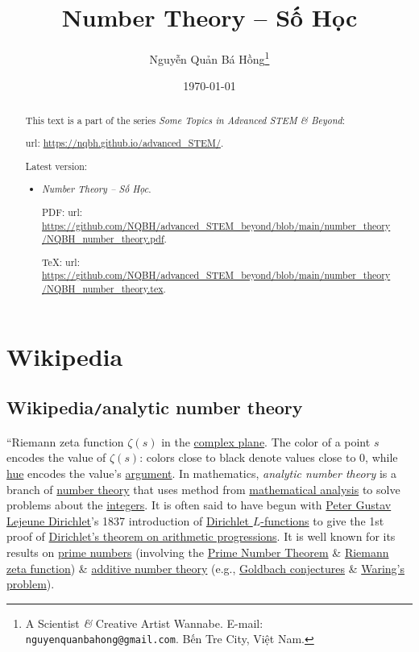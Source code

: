 \documentclass{article}
\title{Number Theory -- Số Học}
\author{Nguyễn Quản Bá Hồng\footnote{A Scientist {\it\&} Creative Artist Wannabe. E-mail: {\tt nguyenquanbahong@gmail.com}. Bến Tre City, Việt Nam.}}
\date{\today}
\begin{document}
\maketitle
\begin{abstract}
	This text is a part of the series {\it Some Topics in Advanced STEM \& Beyond}:
	
	{\sc url}: \url{https://nqbh.github.io/advanced_STEM/}.
	
	Latest version:
	\begin{itemize}
		\item {\it Number Theory -- Số Học}.
		
		PDF: {\sc url}: \url{https://github.com/NQBH/advanced_STEM_beyond/blob/main/number_theory/NQBH_number_theory.pdf}.
		
		\TeX: {\sc url}: \url{https://github.com/NQBH/advanced_STEM_beyond/blob/main/number_theory/NQBH_number_theory.tex}.
	\end{itemize}
\end{abstract}
\tableofcontents


\section{Wikipedia}

\subsection{Wikipedia{\tt/}analytic number theory}
``{\sf Riemann zeta function $\zeta(s)$ in the \href{https://en.wikipedia.org/wiki/Complex_plane}{complex plane}. The color of a point $s$ encodes the value of $\zeta(s)$: colors close to black denote values close to 0, while \href{https://en.wikipedia.org/wiki/Hue}{hue} encodes the value's \href{https://en.wikipedia.org/wiki/Argument_(complex_analysis)}{argument}.} In mathematics, {\it analytic number theory} is a branch of \href{https://en.wikipedia.org/wiki/Number_theory}{number theory} that uses method from \href{https://en.wikipedia.org/wiki/Mathematical_analysis}{mathematical analysis} to solve problems about the \href{https://en.wikipedia.org/wiki/Integer}{integers}. It is often said to have begun with \href{https://en.wikipedia.org/wiki/Peter_Gustav_Lejeune_Dirichlet}{\sc Peter Gustav Lejeune Dirichlet}'s 1837 introduction of \href{https://en.wikipedia.org/wiki/Dirichlet_L-function}{Dirichlet $L$-functions} to give the 1st proof of \href{https://en.wikipedia.org/wiki/Dirichlet%27s_theorem_on_arithmetic_progressions}{Dirichlet's theorem on arithmetic progressions}. It is well known for its results on \href{https://en.wikipedia.org/wiki/Prime_numbers}{prime numbers} (involving the \href{https://en.wikipedia.org/wiki/Prime_Number_Theorem}{Prime Number Theorem} \& \href{https://en.wikipedia.org/wiki/Riemann_zeta_function}{Riemann zeta function}) \& \href{https://en.wikipedia.org/wiki/Additive_number_theory}{additive number theory} (e.g., \href{https://en.wikipedia.org/wiki/Goldbach_conjecture}{Goldbach conjectures} \& \href{https://en.wikipedia.org/wiki/Waring%27s_problem}{Waring's problem}).
\end{document}
